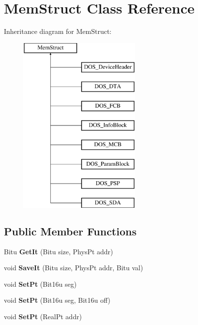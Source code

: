 \hypertarget{classMemStruct}{\section{Mem\-Struct Class Reference}
\label{classMemStruct}
}
Inheritance diagram for Mem\-Struct\-:\begin{figure}[H]
\begin{center}
\leavevmode
\includegraphics[height=9.000000cm]{classMemStruct}
\end{center}
\end{figure}
\subsection*{Public Member Functions}
\begin{DoxyCompactItemize}
\item 
\hypertarget{classMemStruct_ae257f02726d2612ff8b6ba8954a6ea7b}{Bitu {\bfseries Get\-It} (Bitu size, Phys\-Pt addr)}\label{classMemStruct_ae257f02726d2612ff8b6ba8954a6ea7b}

\item 
\hypertarget{classMemStruct_af54833627750beb79957b4242a9e83ca}{void {\bfseries Save\-It} (Bitu size, Phys\-Pt addr, Bitu val)}\label{classMemStruct_af54833627750beb79957b4242a9e83ca}

\item 
\hypertarget{classMemStruct_ac33382e79642fd654c906dc639345be0}{void {\bfseries Set\-Pt} (Bit16u seg)}\label{classMemStruct_ac33382e79642fd654c906dc639345be0}

\item 
\hypertarget{classMemStruct_ab13cee0de756918c027636071578de54}{void {\bfseries Set\-Pt} (Bit16u seg, Bit16u off)}\label{classMemStruct_ab13cee0de756918c027636071578de54}

\item 
\hypertarget{classMemStruct_a8d0989faeef5b6f8fec3d5b4aadf62bc}{void {\bfseries Set\-Pt} (Real\-Pt addr)}\label{classMemStruct_a8d0989faeef5b6f8fec3d5b4aadf62bc}

\end{DoxyCompactItemize}
